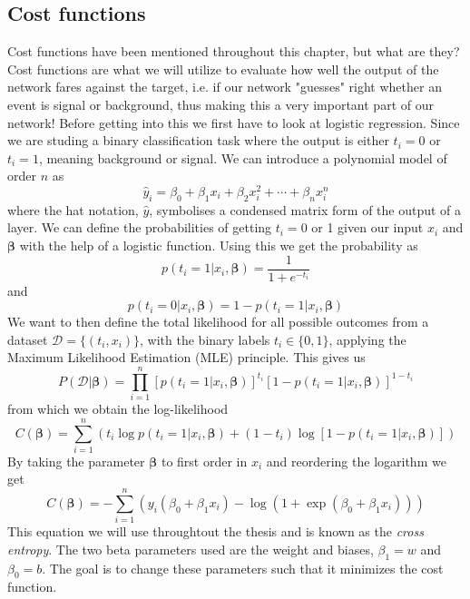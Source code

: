 \documentclass[14pt, a4paper]{book}
\begin{document}
\subsection{Cost functions}
Cost functions have been mentioned throughout this chapter, but what are they? Cost functions are what we will utilize to evaluate how well the output of the network fares against the target, i.e. if our network "guesses" right whether an event is signal or background, 
thus making this a very important part of our network! Before getting into this we first have to look at logistic regression. Since we are studing a binary classification task where the output is either $t_i=0$ or $t_i = 1$, meaning background or signal. 
We can introduce a polynomial model of order $n$ as
$$
\hat{y}_i=\beta_0+\beta_1x_i+\beta_2x_i^2+\cdots+\beta_nx_i^n
$$
where the hat notation, $\hat y$, symbolises a condensed matrix form of the output of a layer. We can define the probabilities of getting $t_i=0$ or 1 given our input $x_i$ and $\bm{\beta}$ with the help of a logistic function. 
Using this we get the probability as
$$
p(t_i=1\vert x_i,\bm{\beta})=\frac{1}{1+e^{-t_i}}
$$
and
$$
p(t_i=0\vert x_i,\bm{\beta})=1- p(t_i=1\vert x_i,\bm{\beta})
$$
We want to then define the total likelihood for all possible outcomes from a dataset $\mathcal{D}=\{(t_i,x_i)\}$, with the binary labels $t_i\in\{0,1\}$, applying the Maximum Likelihood Estimation (MLE) principle. 
This gives us
$$
P(\mathcal{D}\vert\bm{\beta})=\prod_{i=1}^n\left[p(t_i=1\vert x_i,\bm{\beta})\right]^{t_i}\left[1-p(t_i=1\vert x_i,\bm{\beta})\right]^{1-t_i}
$$
from which we obtain the log-likelihood
$$
C(\bm{\beta})=\sum_{i=1}^n\left(t_i\log p(t_i=1\vert x_i,\bm{\beta})+(1-t_i)\log[1-p(t_i=1\vert x_i,\bm{\beta})]\right)
$$
By taking the parameter $\bm{\beta}$ to first order in $x_i$ and reordering the logarithm we get
\begin{equation}\label{eq:CrossEntropy}
    C(\bm{\beta})=-\sum_{i=1}^n(y_i(\beta_0+\beta_1x_i)-\log(1+\exp(\beta_0+\beta_1x_i)))
\end{equation}
This equation we will use throughtout the thesis and is known as the \textit{cross entropy}. The two beta parameters used are the weight and biases, $\beta_1 = w$ and $\beta_0 = b$. The goal is to change these parameters such that it minimizes the cost function. 
\end{document}

